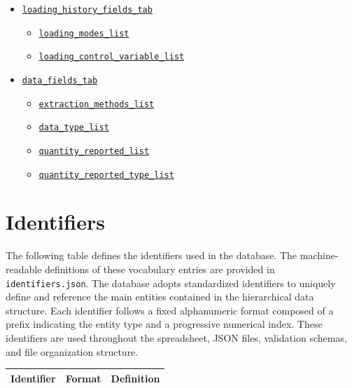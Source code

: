 \documentclass[11pt]{book}
\begin{document}
{\begin{itemize}
   \begin{itemize}
         \item \hyperref[vocab:devices_and_supports_list]{\texttt{devices\_and\_supports\_list}}
    \end{itemize}
%
   \item \hyperref[vocab:loading_history_fields_tab]{\texttt{loading\_history\_fields\_tab}}
   \begin{itemize}
         \item \hyperref[vocab:loading_modes_list]{\texttt{loading\_modes\_list}}
         \item \hyperref[vocab:loading_control_variable_list]{\texttt{loading\_control\_variable\_list}}
    \end{itemize}
%
   \item \hyperref[vocab:data_fields_tab]{\texttt{data\_fields\_tab}}
   \begin{itemize}
         \item \hyperref[vocab:extraction_methods_list]{\texttt{extraction\_methods\_list}}
         \item \hyperref[vocab:data_types_list]{\texttt{data\_type\_list}}
         \item \hyperref[vocab:reported_quantity_list]{\texttt{quantity\_reported\_list}}
         \item \hyperref[vocab:quantity_reported_type_list]{\texttt{quantity\_reported\_type\_list}}
    \end{itemize}
\end{itemize}

\section{Identifiers}
\label{vocab:identifiers}
The following table defines the identifiers used in the database. The machine-readable definitions of these vocabulary entries are provided in \texttt{identifiers.json}. The database adopts standardized identifiers to uniquely define and reference the main entities contained in the hierarchical data structure. Each identifier follows a fixed alphanumeric format composed of a prefix indicating the entity type and a progressive numerical index. These identifiers are used throughout the spreadsheet, JSON files, validation schemas, and file organization structure.

\begin{longtable}{p{}p{}p{}}
\hline
\textbf{Identifier} & \textbf{Format} & \textbf{Definition} \\
\hline
\endfirsthead


\end{longtable}}
\end{document}

